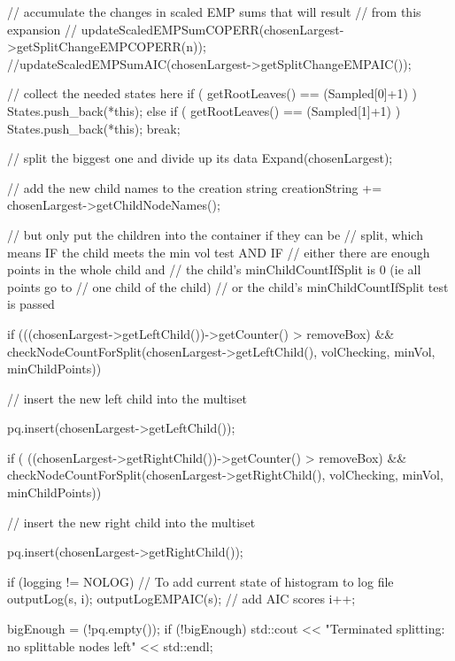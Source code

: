\begin{DoxyCode}
{{{            // accumulate the changes in scaled EMP sums that will result
            // from this expansion
            //
      updateScaledEMPSumCOPERR(chosenLargest->getSplitChangeEMPCOPERR(n));
            //updateScaledEMPSumAIC(chosenLargest->getSplitChangeEMPAIC());

        // collect the needed states here
        if ( getRootLeaves() == (Sampled[0]+1) ) {
          States.push_back(*this);
        }
        else if ( getRootLeaves() == (Sampled[1]+1) ) {
          States.push_back(*this);
          break;
        }

            // split the biggest one and divide up its data
             Expand(chosenLargest);

            // add the new child names to the creation string
            creationString += chosenLargest->getChildNodeNames();

            // but only put the children into the container if they can be
            // split, which means IF the child meets the min vol test AND IF
            // either there are enough points in the whole child and
                // the child's minChildCountIfSplit is 0 (ie all points go to
                // one child of the child)
            // or the child's minChildCountIfSplit test is passed

            if (((chosenLargest->getLeftChild())->getCounter() > removeBox) &&
             checkNodeCountForSplit(chosenLargest->getLeftChild(),
                  volChecking, minVol, minChildPoints)) {
                // insert the new left child into the multiset
                
                pq.insert(chosenLargest->getLeftChild());
            }

            if ( ((chosenLargest->getRightChild())->getCounter() > removeBox) 
      &&
                 checkNodeCountForSplit(chosenLargest->getRightChild(),
                    volChecking, minVol, minChildPoints)) {
                // insert the new right child into the multiset
               
                pq.insert(chosenLargest->getRightChild());
            }

            if (logging != NOLOG) {
                // To add current state of histogram to log file
                outputLog(s, i);
                outputLogEMPAIC(s); // add AIC scores
                i++;
            }

            bigEnough = (!pq.empty());
            if (!bigEnough)
                std::cout << "Terminated splitting: no splittable nodes left"
                    << std::endl;
        
}}}
\end{DoxyCode}
